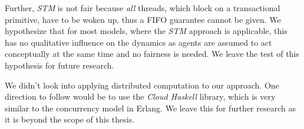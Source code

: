 Further, \textit{STM} is not fair because \textit{all} threads, which block on a transactional primitive, have to be woken up, thus a FIFO guarantee cannot be given. We hypothesize that for most models, where the \textit{STM} approach is applicable, this has no qualitative influence on the dynamics as agents are assumed to act conceptually at the same time and no fairness is needed. We leave the test of this hypothesis for future research.

We didn't look into applying distributed computation to our approach. One direction to follow would be to use the \textit{Cloud Haskell} library, which is very similar to the concurrency model in Erlang. We leave this for further research as it is beyond the scope of this thesis.

